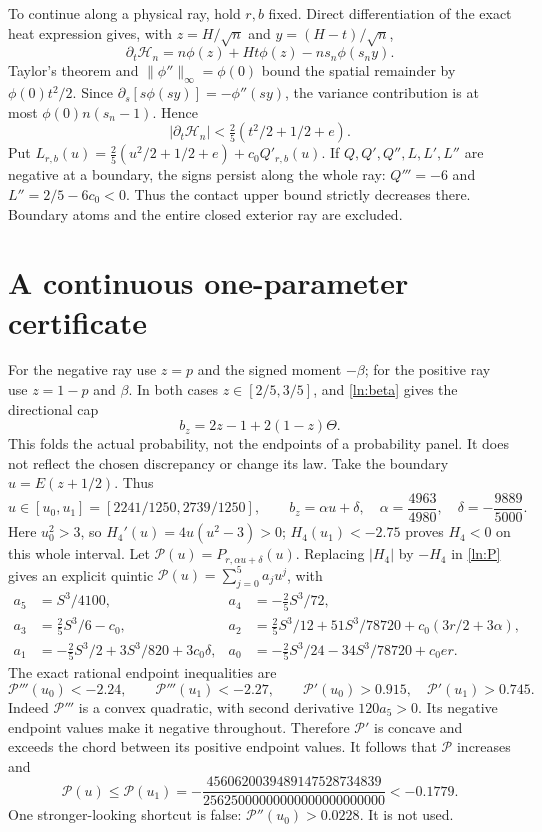 \documentclass[11pt]{article}
\begin{document}
To continue along a physical ray, hold $r,b$ fixed. Direct differentiation
of the exact heat expression gives, with $z=H/\sqrt n$ and
$y=(H-t)/\sqrt n$,
\[
 \partial_t\mathcal H_n=n\phi(z)+Ht\phi(z)-ns_n\phi(s_ny).
\]
Taylor's theorem and $\|\phi''\|_\infty=\phi(0)$ bound the spatial
remainder by $\phi(0)t^2/2$. Since
$\partial_s[s\phi(sy)]=-\phi''(sy)$, the variance contribution is at
most $\phi(0)n(s_n-1)$. Hence
\[
 |\partial_t\mathcal H_n|<\tfrac25(t^2/2+1/2+e).
\]
Put $L_{r,b}(u)=\tfrac25(u^2/2+1/2+e)+c_0Q'_{r,b}(u)$.
If $Q,Q',Q'',L,L',L''$ are negative at a boundary, the signs persist
along the whole ray: $Q'''=-6$ and $L''=2/5-6c_0<0$.
Thus the contact upper bound strictly decreases there. Boundary atoms
and the entire closed exterior ray are excluded.

\section{A continuous one-parameter certificate}
For the negative ray use $z=p$ and the signed moment $-\beta$; for the
positive ray use $z=1-p$ and $\beta$. In both cases $z\in[2/5,3/5]$,
and \eqref{ln:beta} gives the directional cap
\[
 b_z=2z-1+2(1-z)\Theta.
\]
This folds the actual probability, not the endpoints of a probability
panel. It does not reflect the chosen discrepancy or change its law.
Take the boundary $u=E(z+1/2)$. Thus
\[
 u\in[u_0,u_1]=[2241/1250,2739/1250],\qquad
 b_z=\alpha u+\delta,
 \quad\alpha=\frac{4963}{4980},\quad\delta=-\frac{9889}{5000}.
\]
Here $u_0^2>3$, so $H_4'(u)=4u(u^2-3)>0$;
$H_4(u_1)<-2.75$ proves $H_4<0$ on this whole interval.
Let $\mathcal P(u)=P_{r,\alpha u+\delta}(u)$.
Replacing $|H_4|$ by $-H_4$ in \eqref{ln:P} gives an explicit quintic
$\mathcal P(u)=\sum_{j=0}^5 a_j u^j$, with
\begin{align*}
 a_5&=S^3/4100,& a_4&=-\tfrac25S^3/72,\\
 a_3&=\tfrac25S^3/6-c_0,&
 a_2&=\tfrac25S^3/12+51S^3/78720+c_0(3r/2+3\alpha),\\
 a_1&=-\tfrac25S^3/2+3S^3/820+3c_0\delta,&
 a_0&=-\tfrac25S^3/24-34S^3/78720+c_0er.
\end{align*}
The exact rational endpoint inequalities are
\[
 \mathcal P'''(u_0)<-2.24,\qquad \mathcal P'''(u_1)<-2.27,
 \qquad \mathcal P'(u_0)>0.915,\quad \mathcal P'(u_1)>0.745.
\]
Indeed $\mathcal P'''$ is a convex quadratic, with second derivative
$120a_5>0$. Its negative endpoint values make it negative throughout.
Therefore $\mathcal P'$ is concave and exceeds the chord between its
positive endpoint values. It follows that $\mathcal P$ increases and
\begin{equation}\label{ln:margin}
 \mathcal P(u)\le\mathcal P(u_1)
 =-\frac{4560620039489147528734839}{25625000000000000000000000}
 <-0.1779.
\end{equation}
One stronger-looking shortcut is false:
$\mathcal P''(u_0)>0.0228$. It is not used.
\end{document}
